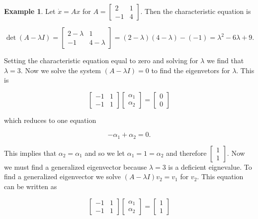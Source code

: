 \documentclass[12pt]{article}
\theoremstyle{definition}
\newtheorem*{example}{Example}
\begin{document}
\begin{example}
Let $\dot x = Ax$ for $A = \begin{bmatrix} 2 & 1 \\ -1 & 4 \end{bmatrix}$. Then the characteristic equation is

\begin{equation*}
\det (A - \lambda I) =
\begin{bmatrix}
2 - \lambda & 1 \\
-1 & 4 - \lambda
\end{bmatrix}
= (2 - \lambda)(4 - \lambda) - (-1) = \lambda^2 - 6 \lambda + 9.
\end{equation*}



Setting the characteristic equation equal to zero and solving for $\lambda$ we find that $\lambda = 3$. Now we 
solve the system $(A - \lambda I) = 0$ to find the eigenvetors for $\lambda$. This is

\begin{equation*}
\begin{bmatrix}
-1 & 1 \\
-1 & 1
\end{bmatrix}
\begin{bmatrix}
\alpha_1 \\
\alpha_2
\end{bmatrix}
=
\begin{bmatrix}
0 \\
0
\end{bmatrix}
\end{equation*}

which reduces to one equation

\begin{equation*}
-\alpha_1 + \alpha_2 = 0.
\end{equation*}

This implies that $\alpha_2 = \alpha_1$ and so we let $\alpha_1 = 1 = \alpha_2$ and therefore
$\begin{bmatrix} 1 \\ 1 \end{bmatrix}$. Now we must find a generalized eigenvector because
$\lambda = 3$ is a deficient eignevalue. To find a generalized eigenvector we solve
$(A - \lambda I) v_2 = v_1$ for $v_2$. This equation can be written as

\begin{equation*}
\begin{bmatrix}
-1 & 1 \\
-1 & 1
\end{bmatrix}
\begin{bmatrix}
\alpha_1 \\
\alpha_2
\end{bmatrix}
=
\begin{bmatrix}
1 \\
1
\end{bmatrix}
\end{equation*}


\end{example}
\end{document}
